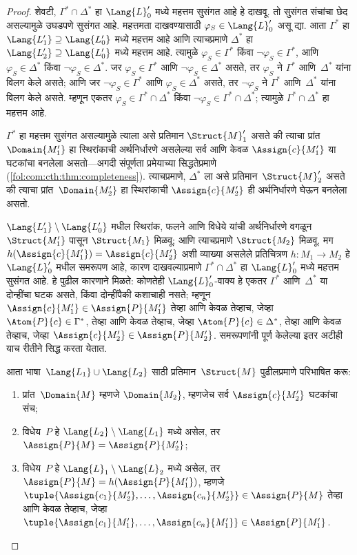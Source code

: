 \begin{proof}
शेवटी, $\Gamma^* \cap \Delta^*$ हा $\Lang{L}'_0$ मध्ये महत्तम सुसंगत
आहे हे दाखवू. तो सुसंगत संचांचा छेद असल्यामुळे उघडपणे सुसंगत आहे. महत्तमता
दाखवण्यासाठी $\varphi_{S} \in \Lang{L}'_0$ असू द्या. आता $\Gamma^*$ हा
$\Lang{L'_1} \supseteq \Lang{L'_0}$ मध्ये महत्तम आहे आणि त्याचप्रमाणे
$\Delta^*$ हा $\Lang{L'_2} \supseteq \Lang{L'_0}$ मध्ये महत्तम आहे.
त्यामुळे $\varphi_{S} \in \Gamma^*$ किंवा $\lnot \varphi_{S} \in \Gamma^*$, आणि
$\varphi_{S} \in \Delta^*$ किंवा $\lnot \varphi_{S} \in \Delta^*$. जर $\varphi_{S} \in
\Gamma^*$ आणि $\lnot \varphi_{S} \in \Delta^*$ असते, तर $\varphi_{S}$ ने $\Gamma^*$
आणि~$\Delta^*$ यांना विलग केले असते; आणि जर $\lnot \varphi_{S} \in \Gamma^*$
आणि $\varphi_{S} \in \Delta^*$ असते, तर $\lnot \varphi_{S}$ ने $\Gamma^*$ आणि~$\Delta^*$
यांना विलग केले असते. म्हणून एकतर $\varphi_{S} \in \Gamma^* \cap \Delta^*$
किंवा $\lnot \varphi_{S} \in \Gamma^* \cap \Delta^*$; त्यामुळे $\Gamma^* \cap
\Delta^*$ हा महत्तम आहे.

$\Gamma^*$ हा महत्तम सुसंगत असल्यामुळे त्याला असे प्रतिमान
$\Struct{M}'_1$ असते की त्याचा प्रांत~$\Domain{M'_1}$ हा
स्थिरांकाची अर्थनिर्धारणे असलेल्या सर्व आणि केवळ $\Assign{c}{M'_1}$
या घटकांचा बनलेला असतो---अगदी संपूर्णता प्रमेयाच्या सिद्धतेप्रमाणे
(\ref{fol:com:cth:thm:completeness}). त्याचप्रमाणे, $\Delta^*$ ला
असे प्रतिमान~$\Struct{M}'_2$ असते की त्याचा प्रांत~$\Domain{M'_2}$
हा स्थिरांकाची $\Assign{c}{M'_2}$ ही अर्थनिर्धारणे घेऊन बनलेला असतो.

$\Lang{L'_1} \setminus \Lang{L'_0}$ मधील स्थिरांक, फलने
आणि विधेये यांची अर्थनिर्धारणे वगळून $\Struct{M'_1}$ पासून
$\Struct{M_1}$ मिळवू; आणि त्याचप्रमाणे $\Struct{M_2}$ मिळवू. मग
$h(\Assign{c}{M'_1}) = \Assign{c}{M'_2}$ अशी व्याख्या असलेले प्रतिचित्रण
$h \colon M_1 \to M_2$ हे $\Lang{L}'_0$ मधील समरूपण आहे, कारण दाखवल्याप्रमाणे
$\Gamma^* \cap \Delta^*$ हा $\Lang{L}'_0$ मध्ये महत्तम सुसंगत आहे. हे
पुढील कारणाने मिळते: कोणतेही $\Lang{L}'_0$-वाक्य हे एकतर $\Gamma^*$
आणि~$\Delta^*$ या दोन्हींचा घटक असते, किंवा दोन्हींपैकी कशाचाही नसते;
म्हणून $\Assign{c}{M'_1} \in \Assign{P}{M'_1}$ तेव्हा आणि केवळ तेव्हाच,
जेव्हा $\Atom{P}{c} \in \Gamma^*$, तेव्हा आणि केवळ तेव्हाच, जेव्हा
$\Atom{P}{c} \in \Delta^*$, तेव्हा आणि केवळ तेव्हाच, जेव्हा
$\Assign{c}{M'_2} \in \Assign{P}{M'_2}$. समरूपणांनी पूर्ण केलेल्या इतर
अटीही याच रीतीने सिद्ध करता येतात.

आता भाषा~$\Lang{L_1} \cup \Lang{L_2}$ साठी प्रतिमान~$\Struct{M}$
पुढीलप्रमाणे परिभाषित करू:
\begin{enumerate}
\item प्रांत~$\Domain{M}$ म्हणजे $\Domain{M_2}$, म्हणजेच सर्व
  $\Assign{c}{M'_2}$ घटकांचा संच;
\item विधेय~$P$ हे $\Lang{L_2} \setminus \Lang{L_1}$ मध्ये
  असेल, तर $\Assign{P}{M} = \Assign{P}{M'_2}$;
\item विधेय~$P$ हे $\Lang{L}_1\setminus \Lang{L}_2$ मध्ये असेल, तर
  $\Assign{P}{M} = h(\Assign{P}{M'_1})$, म्हणजे
  $\tuple{\Assign{c_1}{M'_2}, \dots, \Assign{c_n}{M'_2}} \in
  \Assign{P}{M}$ तेव्हा आणि केवळ तेव्हाच, जेव्हा
  $\tuple{\Assign{c_1}{M'_1}, \dots, \Assign{c_n}{M'_1}} \in
  \Assign{P}{M'_1}$.


\end{enumerate}
\end{proof}
